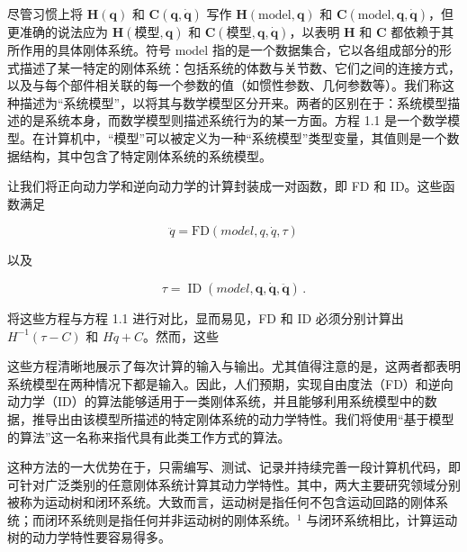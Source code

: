 \documentclass[10pt,a4paper]{book}
\theoremstyle{thmstyle} %
\theoremstyle{defstyle} %
\theoremstyle{prostyle} %
\begin{document}
尽管习惯上将 $\boldsymbol{H}(\boldsymbol{q})$ 和 $\boldsymbol{C}(\boldsymbol{q}, \dot{\boldsymbol{q}})$ 写作 $\boldsymbol{H}(\text{model}, \boldsymbol{q})$ 和 $\boldsymbol{C}(\text{model}, \boldsymbol{q}, \dot{\boldsymbol{q}})$，但更准确的说法应为 $\boldsymbol{H}(\text{模型}, \boldsymbol{q})$ 和 $\boldsymbol{C}(\text{模型}, \boldsymbol{q}, \dot{\boldsymbol{q}})$，以表明 $\boldsymbol{H}$ 和 $\boldsymbol{C}$ 都依赖于其所作用的具体刚体系统。符号 $\text{model}$ 指的是一个数据集合，它以各组成部分的形式描述了某一特定的刚体系统：包括系统的体数与关节数、它们之间的连接方式，以及与每个部件相关联的每一个参数的值（如惯性参数、几何参数等）。我们称这种描述为“系统模型”，以将其与数学模型区分开来。两者的区别在于：系统模型描述的是系统本身，而数学模型则描述系统行为的某一方面。方程 1.1 是一个数学模型。在计算机中，“模型”可以被定义为一种“系统模型”类型变量，其值则是一个数据结构，其中包含了特定刚体系统的系统模型。



让我们将正向动力学和逆向动力学的计算封装成一对函数，即 FD 和 ID。这些函数满足



$$
\ddot { q } = \mathrm { F D } ( m o d e l , q , \dot { q } , \tau )
$$



以及



$$
\tau = \operatorname { I D } ( m o d e l , \boldsymbol{ q } , \dot { \boldsymbol{ q } } , \ddot { \boldsymbol{ q } } ) \, .
$$



将这些方程与方程 1.1 进行对比，显而易见，FD 和 ID 必须分别计算出 $H^{-1}(\tau-C)$ 和 $H\ddot{q}+C$。然而，这些



这些方程清晰地展示了每次计算的输入与输出。尤其值得注意的是，这两者都表明系统模型在两种情况下都是输入。因此，人们预期，实现自由度法（FD）和逆向动力学（ID）的算法能够适用于一类刚体系统，并且能够利用系统模型中的数据，推导出由该模型所描述的特定刚体系统的动力学特性。我们将使用“基于模型的算法”这一名称来指代具有此类工作方式的算法。



这种方法的一大优势在于，只需编写、测试、记录并持续完善一段计算机代码，即可针对广泛类别的任意刚体系统计算其动力学特性。其中，两大主要研究领域分别被称为运动树和闭环系统。大致而言，运动树是指任何不包含运动回路的刚体系统；而闭环系统则是指任何并非运动树的刚体系统。$^{1}$ 与闭环系统相比，计算运动树的动力学特性要容易得多。
\end{document}
